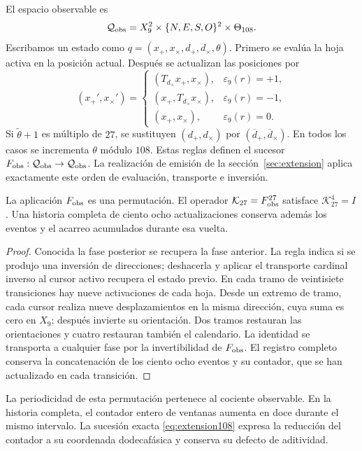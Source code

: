El espacio observable es
\[
 \mathcal Q_{\rm obs}
 =X_9^2\times\{N,E,S,O\}^2\times\Theta_{108}.
\]
Escribamos un estado como
\(q=(x_+,x_\times,d_+,d_\times,\theta)\). Primero se evalúa la hoja
activa en la posición actual. Después se actualizan las posiciones por
\begin{equation}
 (x_+',x_\times')=
 \begin{cases}
 (T_{d_+}x_+,x_\times),&\varepsilon_9(r)=+1,\\
 (x_+,T_{d_\times}x_\times),&\varepsilon_9(r)=-1,\\
 (x_+,x_\times),&\varepsilon_9(r)=0.
 \end{cases}
 \label{ii:tpk-fobs-posiciones}
\end{equation}
Si \(\widetilde\theta+1\) es múltiplo de \(27\), se sustituyen
\((d_+,d_\times)\) por \((\overline d_+,\overline d_\times)\).
En todos los casos se incrementa \(\theta\) módulo \(108\). Estas reglas
definen el sucesor
\(F_{\rm obs}:\mathcal Q_{\rm obs}\to\mathcal Q_{\rm obs}\).
La realización de emisión de la sección~\ref{sec:extension} aplica
exactamente este orden de evaluación, transporte e inversión.

\begin{proposition}
\label{ii:tpk-retorno-observable}
La aplicación \(F_{\rm obs}\) es una permutación. El operador
\(\mathcal K_{27}=F_{\rm obs}^{27}\) satisface
\(\mathcal K_{27}^{4}=I\). Una historia completa de ciento ocho
actualizaciones conserva además los eventos y el acarreo acumulados
durante esa vuelta.
\end{proposition}
\begin{proof}
Conocida la fase posterior se recupera la fase anterior. La regla indica
si se produjo una inversión de direcciones; deshacerla y aplicar el
transporte cardinal inverso al cursor activo recupera el estado previo.
En cada tramo de veintisiete transiciones hay nueve activaciones de cada
hoja. Desde un extremo de tramo, cada cursor realiza nueve desplazamientos
en la misma dirección, cuya suma es cero en \(X_9\); después invierte
su orientación. Dos tramos restauran las orientaciones y cuatro restauran
también el calendario. La identidad se transporta a cualquier fase por
la invertibilidad de \(F_{\rm obs}\). El registro completo conserva la
concatenación de los ciento ocho eventos y su contador, que se han
actualizado en cada transición.
\end{proof}

La periodicidad de esta permutación pertenece al cociente observable. En
la historia completa, el contador entero de ventanas aumenta en doce
durante el mismo intervalo. La sucesión exacta
\eqref{eq:extension108} expresa la reducción del contador a su coordenada
dodecafásica y conserva su defecto de aditividad.

